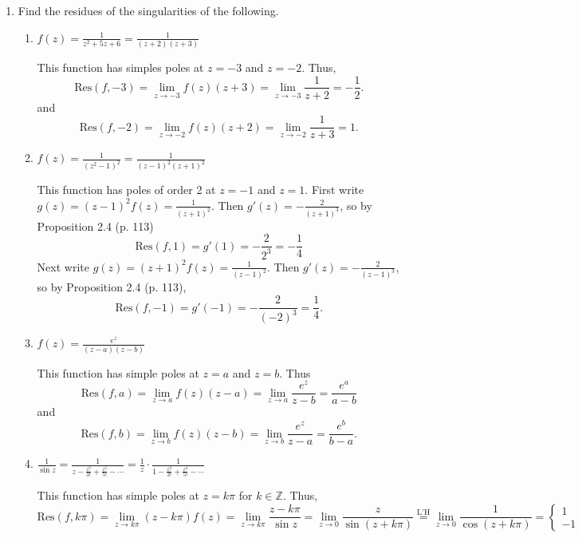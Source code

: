 \documentclass[11pt,oneside,english]{amsart}
\theoremstyle{definition}
\newcommand{\lspace}{\vspace{5mm}}
\newcommand{\lhe}{\stackrel{\text{L'H}}{=}}
\newcommand{\lom}[2]{\lim_{{#1}\rightarrow{#2}}}
\newcommand{\MB}[1]{\mathbb{#1}}
\newcommand{\Res}{\text{Res}}
\begin{document}
\rightline{\today}

\lspace




\begin{enumerate}[leftmargin=*]
\itemsep5mm

\item Find the residues of the singularities of the following.

\begin{enumerate}
\itemsep5mm

\item $\displaystyle f(z)= \frac{1}{z^2+5z+6}=\frac{1}{(z+2)(z+3)}$

This function has simples poles at $z=-3$ and $z=-2$. Thus,
\[
\Res(f,-3)=\lom{z}{-3}f(z)(z+3)=\lom{z}{-3}\frac{1}{z+2}=-\frac{1}{2}.
\]
and
\[
\Res(f,-2)=\lom{z}{-2}f(z)(z+2)=\lom{z}{-2}\frac{1}{z+3}=1.
\]

\item $\displaystyle f(z)=\frac{1}{(z^2-1)^2}=\frac{1}{(z-1)^2(z+1)^2}$ 

This function has poles of order 2 at $z=-1$ and $z=1$. First write $g(z)=(z-1)^2f(z)=\frac{1}{(z+1)^2}$. Then $g'(z)=-\frac{2}{(z+1)^3}$, so by Proposition 2.4 (p. 113)
\[
\Res(f,1)=g'(1)=-\frac{2}{2^3}=-\frac{1}{4}
\]
Next write $g(z)=(z+1)^2f(z)=\frac{1}{(z-1)^2}$. Then $g'(z)=-\frac{2}{(z-1)^3}$, so by Proposition 2.4  (p. 113),
\[
\Res(f,-1)=g'(-1)=-\frac{2}{(-2)^3}=\frac{1}{4}.
\]

\item $\displaystyle f(z)=\frac{e^z}{(z-a)(z-b)}$

This function has simple poles at $z=a$ and $z=b$. Thus
\[
\Res(f,a)=\lom{z}{a}f(z)(z-a)=\lom{z}{a}\frac{e^z}{z-b}=\frac{e^a}{a-b}
\]
and
\[
\Res(f,b)=\lom{z}{b}f(z)(z-b)=\lom{z}{b}\frac{e^z}{z-a}=\frac{e^b}{b-a}.
\]


\item $\displaystyle \frac{1}{\sin z}=\frac{1}{z-\frac{z^3}{3!}+\frac{z^5}{5!}-\cdots}=\frac{1}{z}\cdot\frac{1}{1-\frac{z^2}{3!}+\frac{z^4}{5!}-\cdots}$

This function has simple poles at $z=k\pi$ for $k\in\MB{Z}$. Thus,
\[
\Res(f,k\pi)=\lom{z}{k\pi}(z-k\pi)f(z)=\lom{z}{k\pi}\frac{z-k\pi}{\sin z}=\lom{z}{0}\frac{z}{\sin(z+k\pi)}\lhe \lom{z}{0}\frac{1}{\cos(z+k\pi)}=\begin{cases}1 & \text{if $k$ is even}\\-1 & \text{if $k$ is odd.}\end{cases}
\]


\end{enumerate}
\end{enumerate}
\end{document}
